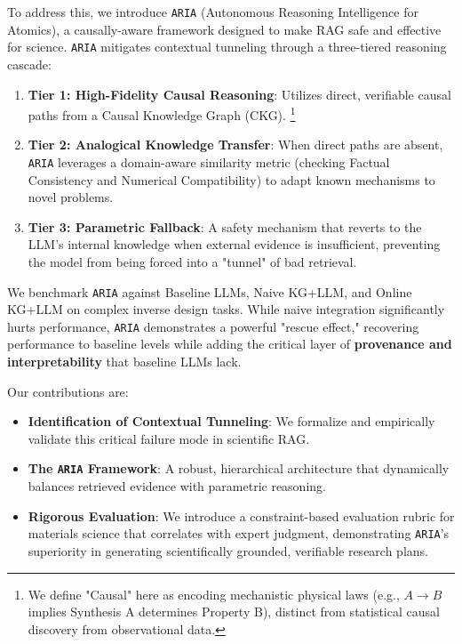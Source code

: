 To address this, we introduce \texttt{ARIA} (Autonomous Reasoning Intelligence for Atomics), a causally-aware framework designed to make RAG safe and effective for science. \texttt{ARIA} mitigates contextual tunneling through a three-tiered reasoning cascade:
\begin{enumerate}
    \item \textbf{Tier 1: High-Fidelity Causal Reasoning}: Utilizes direct, verifiable causal paths from a Causal Knowledge Graph (CKG). \footnote{We define "Causal" here as encoding mechanistic physical laws (e.g., $A \to B$ implies Synthesis A determines Property B), distinct from statistical causal discovery from observational data.}
    \item \textbf{Tier 2: Analogical Knowledge Transfer}: When direct paths are absent, \texttt{ARIA} leverages a domain-aware similarity metric (checking Factual Consistency and Numerical Compatibility) to adapt known mechanisms to novel problems.
    \item \textbf{Tier 3: Parametric Fallback}: A safety mechanism that reverts to the LLM's internal knowledge when external evidence is insufficient, preventing the model from being forced into a "tunnel" of bad retrieval.
\end{enumerate}

We benchmark \texttt{ARIA} against Baseline LLMs, Naive KG+LLM, and Online KG+LLM on complex inverse design tasks. While naive integration significantly hurts performance, \texttt{ARIA} demonstrates a powerful "rescue effect," recovering performance to baseline levels while adding the critical layer of \textbf{provenance and interpretability} that baseline LLMs lack.

Our contributions are:
\begin{itemize}
    \item \textbf{Identification of Contextual Tunneling}: We formalize and empirically validate this critical failure mode in scientific RAG.
    \item \textbf{The \texttt{ARIA} Framework}: A robust, hierarchical architecture that dynamically balances retrieved evidence with parametric reasoning.
    \item \textbf{Rigorous Evaluation}: We introduce a constraint-based evaluation rubric for materials science that correlates with expert judgment, demonstrating \texttt{ARIA}'s superiority in generating scientifically grounded, verifiable research plans.
\end{itemize}
